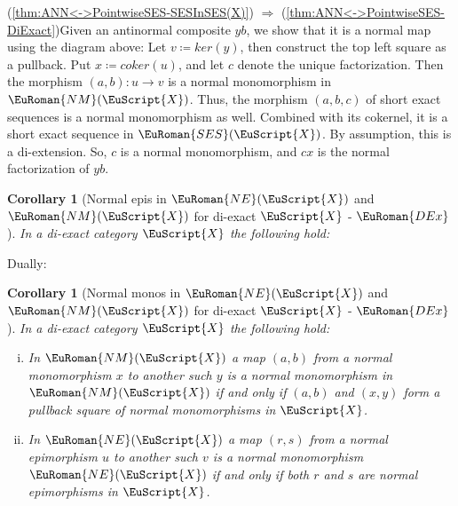 \documentclass [12pt,oneside]{book}%
\makeatletter
\theoremstyle{captionstyle}  %
\newtheorem{corollary}[theorem]{Corollary}
\renewenvironment{proof}[1][\proofname]{\vspace{-2ex}\par       %
	\pushQED{\qed}%
	\normalfont \topsep6\p@\@plus6\p@\relax
	\trivlist
	\item[\hskip\labelsep
	            \color{proofcaption}\bfseries                %
	            #1\@addpunct{\quad}]\ignorespaces
}{%
	\popQED\endtrivlist\@endpefalse
}
\newcommand{\NoProof}{{\unskip\nobreak\hfil\penalty 50\hskip 2em\hbox{}
			\nobreak\hfil$\lozenge$\parfillskip=0pt\finalhyphendemerits=0\par}}
\newcommand{\DefEq}{\coloneq} 		%
\newcommand{\from}{\colon}				%
\newcommand{\Ctgry}[1]{\EuScript{#1}}					%
\newcommand{\SACtgry}[1]{\EuScript{#1}}			%
\newcommand{\NMonoCat}[1]{\EuRoman{NM}(\Ctgry{#1})}				%
\newcommand{\NEpiCat}[1]{\EuRoman{NE}(\Ctgry{#1})}				%
\newcommand{\SESCat}[1]{\EuRoman{SES}(\Ctgry{#1})}				%
\newcommand{\KerMap}[1]{\textit{ker}(#1)}		     	%
\newcommand{\CoKerMap}[1]{\textit{coker}(#1)}						        %
\newcommand{\DExTag}{ - {\color{Cerulean} $\EuRoman{DEx}$}}			%
\makeatother
\begin{document}
\begin{proof}
    (\ref{thm:ANN<->PointwiseSES-SESInSES(X)}) $\Rightarrow$ (\ref{thm:ANN<->PointwiseSES-DiExact})\quad Given an antinormal composite $yb$, we show that it is a normal map using the diagram above: Let $v\DefEq \KerMap{y}$, then construct the top left square as a pullback. Put $x\DefEq \CoKerMap{u}$, and let $c$ denote the unique factorization. Then the morphism $(a,b)\from u\to v$ is a normal monomorphism in $\NMonoCat{X}$. Thus, the morphism $(a,b,c)$ of short exact sequences is a normal monomorphism as well. Combined with its cokernel, it is a short exact sequence in $\SESCat{X}$. By assumption, this is a di-extension. So, $c$ is a normal monomorphism, and $cx$ is the normal factorization of $yb$.
\end{proof}

\begin{corollary}[Normal epis in $\NEpiCat{X}$ and $\NMonoCat{X}$ for di-exact $\SACtgry{X}$\DExTag]
    \label{thm:CoKernelsInNEpi(X)-DiExact}%
    In a di-exact category $\Ctgry{X}$ the following hold:
\end{corollary}

Dually:

\begin{corollary}[Normal monos in $\NEpiCat{X}$ and $\NMonoCat{X}$ for di-exact $\SACtgry{X}$\DExTag]
    \label{thm:NormalMonosInNEpi(X)-Semiabelian}
    In a di-exact category $\Ctgry{X}$ the following hold:
    \begin{enumerate}[(i)]
        \item In $\NMonoCat{X}$ a map $(a,b)$ from a normal monomorphism $x$ to another such $y$ is a normal monomorphism in $\NMonoCat{X}$ if and only if $(a,b)$ and $(x,y)$ form a pullback square of normal monomorphisms in $\Ctgry{X}$.
        \item In $\NEpiCat{X}$ a map $(r,s)$ from a normal epimorphism $u$ to another such $v$ is a normal monomorphism $\NEpiCat{X}$ if and only if  both $r$ and $s$ are normal epimorphisms in $\Ctgry{X}$.
    \end{enumerate}
\end{corollary}
\end{document}
